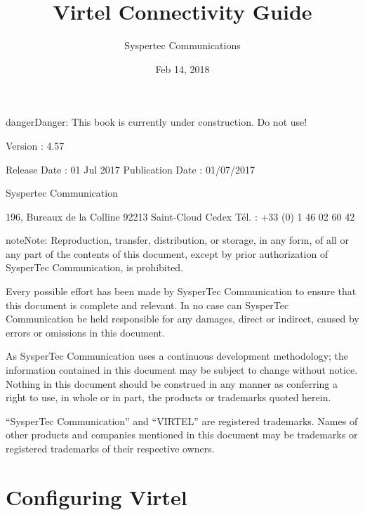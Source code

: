 \documentclass[letterpaper,10pt,english]{sphinxmanual}
\title{Virtel Connectivity Guide}
\date{Feb 14, 2018}
\author{Syspertec Communications}
\begin{document}
\maketitle
\sphinxtableofcontents
{}\label{\detokenize{connectivity_guide::doc}}




\begin{sphinxadmonition}{danger}{Danger:}
This book is currently under construction. Do not use!
\end{sphinxadmonition}

Version : 4.57

Release Date : 01 Jul 2017 Publication Date : 01/07/2017

Syspertec Communication

196, Bureaux de la Colline 92213 Saint-Cloud Cedex Tél. : +33 (0) 1 46 02 60 42


\begin{sphinxadmonition}{note}{Note:}
Reproduction, transfer, distribution, or storage, in any form, of all or any part of
the contents of this document, except by prior authorization of SysperTec
Communication, is prohibited.

Every possible effort has been made by SysperTec Communication to ensure that this document
is complete and relevant. In no case can SysperTec Communication be held responsible for
any damages, direct or indirect, caused by errors or omissions in this document.

As SysperTec Communication uses a continuous development methodology; the information
contained in this document may be subject to change without notice. Nothing in this
document should be construed in any manner as conferring a right to use, in whole or in
part, the products or trademarks quoted herein.

“SysperTec Communication” and “VIRTEL” are registered trademarks. Names of other products
and companies mentioned in this document may be trademarks or registered trademarks of
their respective owners.
\end{sphinxadmonition}


\chapter{Configuring Virtel}
\label{\detokenize{connectivity_guide:v457cn-introduction}}\label{\detokenize{connectivity_guide:configuring-virtel}}\label{\detokenize{connectivity_guide:connectivity-reference-v4-57}}\label{\detokenize{connectivity_guide:virtel457cn}}
\end{document}

